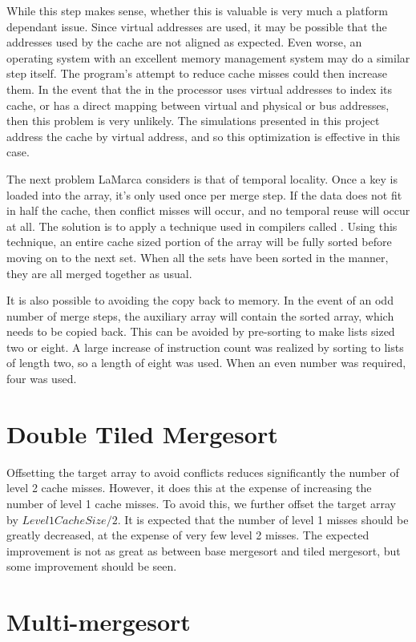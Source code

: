 While this step makes sense, whether this is valuable is very much a platform
dependant issue. Since virtual addresses are used, it may be possible that the
addresses used by the cache are not aligned as expected. Even worse, an
operating system with an excellent memory management system may do a similar
step itself. The program's attempt to reduce cache misses could then increase
them. In the event that the  in the processor uses
virtual addresses to index its cache, or has a direct mapping between virtual
and physical or bus addresses, then this problem is very unlikely. The
simulations presented in this project address the cache by virtual address, and
so this optimization is effective in this case.

The next problem LaMarca considers is that of temporal locality. Once a key is
loaded into the array, it's only used once per merge step. If the data does not
fit in half the cache, then conflict misses will occur, and no temporal reuse
will occur at all. The solution is to apply a technique used in compilers called
. Using this technique, an entire cache sized portion of the array
will be fully sorted before moving on to the next set. When all the sets have
been sorted in the manner, they are all merged together as usual.

It is also possible to avoiding the copy back to memory. In the event of an odd
number of merge steps, the auxiliary array will contain the sorted array, which
needs to be copied back. This can be avoided by pre-sorting to make lists sized
two or eight. A large increase of instruction count was realized by sorting to
lists of length two, so a length of eight was used. When an even number was
required, four was used.

\section{Double Tiled Mergesort}
\label{double tiled mergesort}
Offsetting the target array to avoid conflicts reduces significantly the number
of level 2 cache misses. However, it does this at the expense of increasing the
number of level 1 cache misses. To avoid this, we further offset the target
array by $Level1CacheSize/2$. It is expected that the number of level 1 misses
should be greatly decreased, at the expense of very few level 2 misses. The
expected improvement is not as great as between base mergesort and tiled
mergesort, but some improvement should be seen.

\section{Multi-mergesort}

